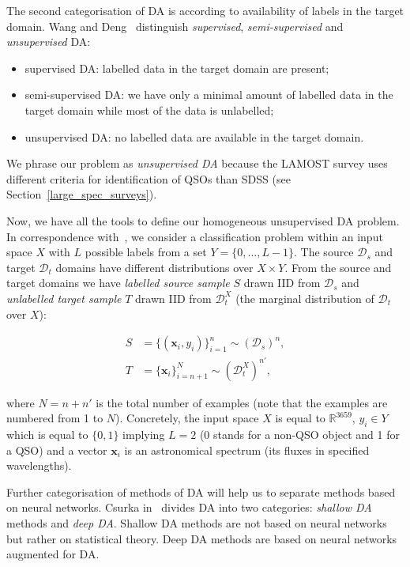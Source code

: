 The second categorisation of DA is according to availability of labels in the target domain.
Wang and Deng~\cite{wang2018} distinguish \textit{supervised}, \textit{semi-supervised} and \textit{unsupervised} DA:

\begin{itemize}
	\item supervised DA: labelled data in the target domain are present;
	\item semi-supervised DA: we have only a minimal amount of labelled data in the target domain while most of the data is unlabelled;
	\item unsupervised DA: no labelled data are available in the target domain.
\end{itemize}

We phrase our problem as \textit{unsupervised DA}
because the LAMOST survey uses different criteria for identification of QSOs than SDSS
(see Section~\ref{large_spec_surveys}).

Now, we have all the tools to define our homogeneous unsupervised DA problem.
In correspondence with~\cite{ganin2016},
we consider a classification problem within an input space \(X\)
with \(L\) possible labels from a set \(Y = \{0, \dots, L - 1\}\).
The source \(\mathcal{D}_s\) and target \(\mathcal{D}_t\) domains
have different distributions over \(X \times Y\).
From the source and target domains
we have \textit{labelled source sample} \(S\) drawn IID from \(\mathcal{D}_s\)
and \textit{unlabelled target sample} \(T\) drawn IID from \(\mathcal{D}^X_t\) 
(the marginal distribution of \(\mathcal{D}_t\) over \(X\)):

\begin{align}
	S &= \{(\mathbf{x}_i, y_i)\}^n_{i = 1} \sim (\mathcal{D}_s)^n, \\
	T &= \{\mathbf{x}_i\}^N_{i = n + 1} \sim (\mathcal{D}^X_t)^{n'},
\end{align}

where \(N = n + n'\) is the total number of examples
(note that the examples are numbered from 1 to \(N\)).
Concretely, the input space \(X\) is equal to \(\mathbb{R}^{3659}\),
\(y_i \in Y\) which is equal to \(\{0, 1\}\) implying \(L = 2\)
(0 stands for a non-QSO object and 1 for a QSO)
and a vector \(\mathbf{x}_i\) is an astronomical spectrum
(its fluxes in specified wavelengths).

Further categorisation of methods of DA will help us to separate methods based on neural networks.
Csurka in~\cite{csurka2017} divides DA into two categories:
\textit{shallow DA} methods and \textit{deep DA}.
Shallow DA methods are not based on neural networks but rather on statistical theory.
Deep DA methods are based on neural networks augmented for DA.


